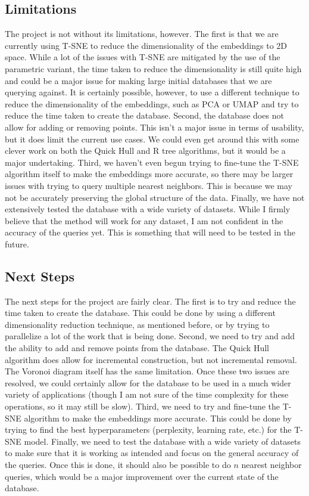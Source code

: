 \documentclass{article}
\begin{document}
\subsection{Limitations}
The project is not without its limitations, however. The first is that 
we are currently using T-SNE to reduce the dimensionality of the embeddings
to 2D space. While a lot of the issues with T-SNE are mitigated by the use
of the parametric variant, the time taken to reduce the dimensionality is
still quite high and could be a major issue for making large initial databases
that we are querying against. It is certainly possible, however, to use a different
technique to reduce the dimensionality of the embeddings, such as PCA or UMAP and 
try to reduce the time taken to create the database. Second, the database does not allow for adding 
or removing points. This isn't a major issue in terms of usability, but it does
limit the current use cases. We could even get around this with some clever work 
on both the Quick Hull and R tree algorithms, but it would be a major undertaking.
Third, we haven't even begun trying to fine-tune the T-SNE algorithm itself to
make the embeddings more accurate, so there may be larger issues with trying to 
query multiple nearest neighbors. This is because we may not be accurately preserving
the global structure of the data. Finally, we have not extensively tested the database
with a wide variety of datasets. While I firmly believe that the method will work for 
any dataset, I am not confident in the accuracy of the queries yet. This is something
that will need to be tested in the future.

\subsection{Next Steps}
The next steps for the project are fairly clear. The first is to try and reduce the
time taken to create the database. This could be done by using a different dimensionality
reduction technique, as mentioned before, or by trying to parallelize a lot of the work
that is being done. Second, we need to try and add the ability to add and remove points
from the database. The Quick Hull algorithm does allow for incremental construction, but
not incremental removal. The Voronoi diagram itself has the same limitation. Once these 
two issues are resolved, we could certainly allow for the database to be used in a much
wider variety of applications (though I am not sure of the time complexity for these operations,
so it may still be slow). Third, we need to try and fine-tune the T-SNE algorithm to make
the embeddings more accurate. This could be done by trying to find the best hyperparameters
(perplexity, learning rate, etc.) for the T-SNE model. Finally, we need to test the database
with a wide variety of datasets to make sure that it is working as intended and focus on
the general accuracy of the queries. Once this is done, it should also be possible to do 
$n$ nearest neighbor queries, which would be a major improvement over the current state of the database.
\end{document}
